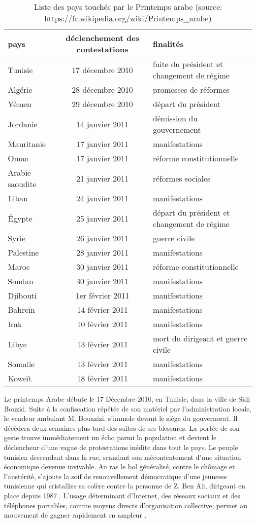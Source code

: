 \documentclass[symmetric,justified,marginals=raggedouter]{tufte-book}
\begin{document}
\begin{table*}
  \label{tab:printemps}
  \begin{tabular}{lcl}
    \toprule
    pays&déclenchement des contestations&finalités\\
    \midrule
Tunisie&17 décembre 2010&fuite du président et changement de régime\\
Algérie&28 décembre 2010&promesses de réformes\\
Yémen&29 décembre 2010&départ du président\\
Jordanie&14 janvier 2011&démission du gouvernement\\
Mauritanie&17 janvier 2011&manifestations\\
Oman&17 janvier 2011&réforme constitutionnelle\\
Arabie saoudite&21 janvier 2011&réformes sociales\\
Liban&24 janvier 2011&manifestations\\
Égypte&25 janvier 2011&départ du président et changement de régime\\
Syrie&26 janvier 2011&guerre civile\\
Palestine&28 janvier 2011&manifestations\\
Maroc&30 janvier 2011&réforme constitutionnelle\\
Soudan&30 janvier 2011&manifestations\\
Djibouti&1er février 2011&manifestations\\
Bahreïn&14 février 2011&manifestations\\
Irak&10 février 2011&manifestations\\
Libye&13 février 2011&mort du dirigeant et guerre civile\\
Somalie&13 février 2011&manifestations\\
Koweït&18 février 2011&manifestations\\
  \bottomrule
  \end{tabular}
  \bigskip
  \caption{Liste des pays touchés par le Printemps arabe (source: \url{https://fr.wikipedia.org/wiki/Printemps_arabe})}
\end{table*}

\noindent Le printemps Arabe débute le 17 Décembre 2010, en Tunisie, dans la ville de Sidi Bouzid. Suite à la confiscation répétée de son matériel par l'administration locale, le vendeur ambulant M. Bouazizi, s'immole devant le siège du gouvernorat. Il décèdera deux semaines plus tard des suites de ses blessures. La portée de son geste trouve immédiatement un écho parmi la population et devient le déclencheur d'une vague de protestations inédite dans tout le pays. Le peuple tunisien descendant dans la rue, scandant son mécontentement d'une situation économique devenue invivable. Au ras le bol généralisé, contre le chômage et l'austérité, s'ajoute la soif de renouvellement démocratique d'une jeunesse tunisienne qui cristallise sa colère contre la personne de Z. Ben Ali, dirigeant en place depuis 1987 \citep{salmon_29_2016}. L'usage déterminant d'Internet, des réseaux sociaux et des téléphones portables, comme moyens directs d'organisation collective, permet au mouvement de gagner rapidement en ampleur \citep{lotan_arab_2011, khondker_role_2011}.    
\end{document}
